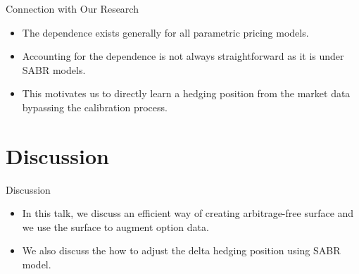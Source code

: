 \documentclass[10pt,table,mathserif]{beamer}
\begin{document}
\begin{frame}{Connection with Our Research}
\begin{itemize}
	\item The dependence exists generally for all parametric pricing models.
	\item Accounting for the dependence is not always straightforward as it is under SABR models.
	\item This motivates us to directly learn a hedging position from the market data bypassing the calibration process.
\end{itemize}

\end{frame}




\section{Discussion}
\begin{frame}{Discussion}
\begin{itemize}
	\item In this talk, we discuss an efficient way of creating arbitrage-free surface and we use the surface to augment option data.
	\item We also discuss the how to adjust the delta hedging position using SABR model.
\end{itemize}
\end{frame}
\end{document}
